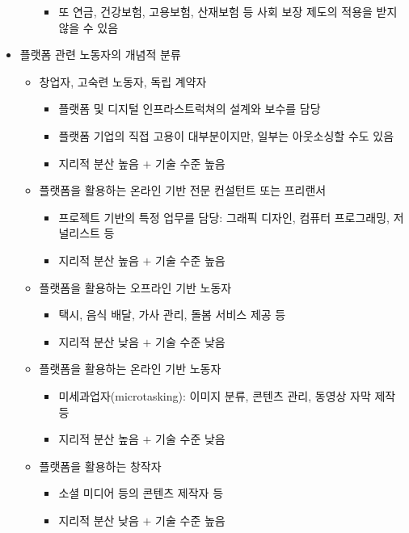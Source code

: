 \begin{itemize}
\begin{itemize}
\begin{itemize}
		\item 또 연금, 건강보험, 고용보험, 산재보험 등 사회 보장 제도의 적용을 받지 않을 수 있음
		\end{itemize}
	\end{itemize}	
\item 플랫폼 관련 노동자의 개념적 분류 \citep{Vallas:2020aa}
	\begin{itemize}
	\item 창업자, 고숙련 노동자, 독립 계약자
		\begin{itemize}
		\item 플랫폼 및 디지털 인프라스트럭쳐의 설계와 보수를 담당
		\item 플랫폼 기업의 직접 고용이 대부분이지만, 일부는 아웃소싱할 수도 있음
		\item 지리적 분산 높음 $+$ 기술 수준 높음
		\end{itemize}
	\item 플랫폼을 활용하는 온라인 기반 전문 컨설턴트 또는 프리랜서
		\begin{itemize}
		\item 프로젝트 기반의 특정 업무를 담당: 그래픽 디자인, 컴퓨터 프로그래밍, 저널리스트 등 
		\item 지리적 분산 높음 $+$ 기술 수준 높음
		\end{itemize}	
	\item 플랫폼을 활용하는 오프라인 기반 노동자
		\begin{itemize}
		\item 택시, 음식 배달, 가사 관리, 돌봄 서비스 제공 등
		\item 지리적 분산 낮음 $+$ 기술 수준 낮음
		\end{itemize}
	\item 플랫폼을 활용하는 온라인 기반 노동자
		\begin{itemize}
		\item 미세과업자(microtasking): 이미지 분류, 콘텐츠 관리, 동영상 자막 제작 등
		\item 지리적 분산 높음 $+$ 기술 수준 낮음
		\end{itemize}
	\item 플랫폼을 활용하는 창작자
		\begin{itemize}
		\item 소셜 미디어 등의 콘텐츠 제작자 등
		\item 지리적 분산 낮음 $+$ 기술 수준 높음
		\end{itemize}	
	\end{itemize}	
\end{itemize}	

